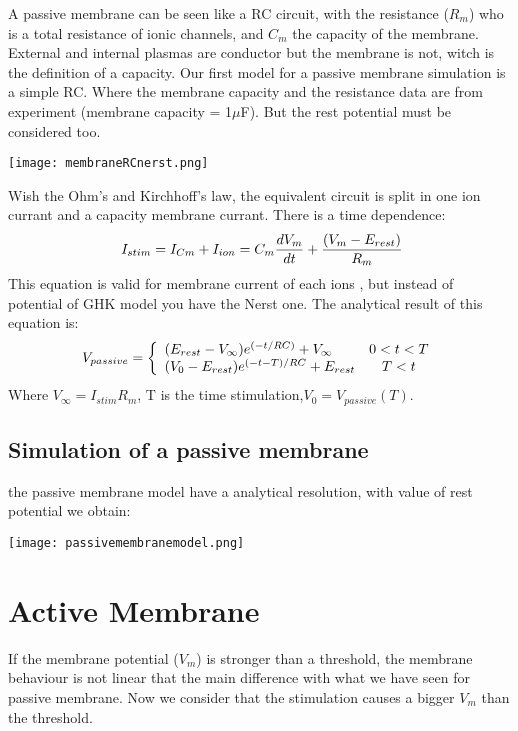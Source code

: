 \documentclass[a4paper,10pt]{report}
\begin{document}
A passive membrane can be seen like a RC circuit, with the resistance ($R_{m}$) who is a total resistance of ionic channels, and $C_{m}$ the capacity of the membrane. External and internal plasmas are conductor but the membrane is not, witch is the definition of a capacity. Our first model for a passive membrane simulation is a simple RC. Where the membrane capacity and the resistance data are from experiment (membrane capacity = 1$\mu$F). But the rest potential must be considered too.
\begin{center}
\texttt{[image: membraneRCnerst.png]} 
\label{fig1}
\end{center}
Wish the Ohm's and Kirchhoff's law, the equivalent circuit is split in one ion currant and a capacity membrane currant. There is a time dependence:\\  
$$
\ I_{stim}=I_{Cm}+I_{ion}=C_{m} \frac{dV_{m}}{dt}+ \frac{(V_{m}-E_{rest})}{R_{m}} \\
$$
This equation is valid for membrane current of each ions , but instead of potential of GHK model you have the Nerst one. The analytical result of this equation is:\\
$$
 V_{passive}=
\left\{
\begin{array}{l c} 
(E_{rest}-V_{\infty})e^{(-t/RC)}+V_{\infty} & 0 < t < T \\
(V_{0}-E_{rest})e^{(-t-T)/RC}+E_{rest} & T < t 
\end{array}
\right.
$$
Where $V_{\infty}=I_{stim}R_{m}$, T is the time stimulation,$V_{0} =V_{passive}(T)$.\\

\subsection{Simulation of a passive membrane}
the passive membrane model have a analytical resolution, with value of rest potential we obtain:
\begin{center}
\texttt{[image: passivemembranemodel.png]} 
\label{fig1}
\end{center}


\section{Active Membrane}  
If the membrane potential ($V_{m}$)	 is stronger than a threshold, the membrane behaviour is not linear that the main difference with what we have seen for passive membrane. Now we consider that the stimulation causes a bigger $V_{m}$ than the threshold. 
\end{document}

